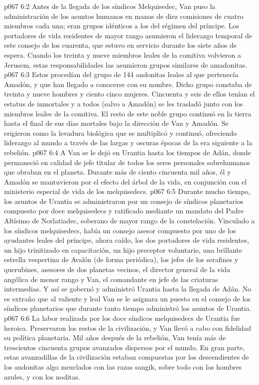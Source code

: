 \vs p067 6:2 Antes de la llegada de los síndicos Melquisedec, Van puso la administración de los asuntos humanos en manos de diez comisiones de cuatro miembros cada una; eran grupos idénticos a los del régimen del príncipe. Los portadores de vida residentes de mayor rango asumieron el liderazgo temporal de este consejo de los cuarenta, que estuvo en servicio durante los siete años de espera. Cuando los treinta y nueve miembros leales de la comitiva volvieron a Jerusem, estas responsabilidades las asumieron grupos similares de amadonitas.
\vs p067 6:3 Estos  procedían del grupo de 144 andonitas leales al que pertenecía Amadón, y que han llegado a conocerse con su nombre. Dicho grupo constaba de treinta y nueve hombres y ciento cinco mujeres. Cincuenta y seis de ellos tenían el estatus de inmortales y a todos (salvo a Amadón) se les trasladó junto con los miembros leales de la comitiva. El resto de este noble grupo continuó en la tierra hasta el final de sus días mortales bajo la dirección de Van y Amadón. Se erigieron como la levadura biológica que se multiplicó y continuó, ofreciendo liderazgo al mundo a través de las largas y oscuras épocas de la era siguiente a la rebelión.
\vs p067 6:4 A Van se le dejó en Urantia hasta los tiempos de Adán, donde permaneció en calidad de jefe titular de todos los seres personales sobrehumanos que obraban en el planeta. Durante más de ciento cincuenta mil años, él y Amadón se mantuvieron por el efecto del árbol de la vida, en conjunción con el ministerio especial de vida de los melquisedecs.
\vs p067 6:5 \pc Durante mucho tiempo, los asuntos de Urantia se administraron por un consejo de síndicos planetarios compuesto por doce melquisedecs y ratificado mediante un mandato del Padre Altísimo de Norlatiadec, soberano de mayor rango de la constelación. Vinculado a los síndicos melquisedecs, había un consejo asesor compuesto por uno de los ayudantes leales del príncipe, ahora caído, los dos portadores de vida residentes, un hijo trinitizado en capacitación, un hijo preceptor voluntario, una brillante estrella vespertina de Avalón (de forma periódica), los jefes de los serafines y querubines, asesores de dos planetas vecinos, el director general de la vida angélica de menor rango y Van, el comandante en jefe de las criaturas intermedias. Y así se gobernó y administró Urantia hasta la llegada de Adán. No es extraño que al valiente y leal Van se le asignara un puesto en el consejo de los síndicos planetarios que durante tanto tiempo administró los asuntos de Urantia.
\vs p067 6:6 La labor realizada por los doce síndicos melquisedecs de Urantia fue heroica. Preservaron los restos de la civilización, y Van llevó a cabo con fidelidad su política planetaria. Mil años después de la rebelión, Van tenía más de trescientos cincuenta grupos avanzados dispersos por el mundo. En gran parte, estas avanzadillas de la civilización estaban compuestas por los descendientes de los andonitas algo mezclados con las razas sangik, sobre todo con los hombres azules, y con los noditas.
